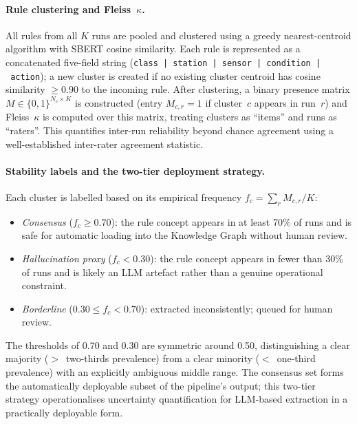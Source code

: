 ﻿\documentclass[11pt]{article}
\begin{document}
\paragraph{Rule clustering and Fleiss~$\kappa$.}
All rules from all $K$ runs are pooled and clustered using a greedy
nearest-centroid algorithm with SBERT cosine similarity.
Each rule is represented as a concatenated five-field string
(\texttt{class~|~station~|~sensor~|~condition~|~action});
a new cluster is created if no existing cluster centroid has cosine
similarity $\geq 0.90$ to the incoming rule.
After clustering, a binary presence matrix
$M \in \{0,1\}^{N_c \times K}$ is constructed (entry $M_{c,r} = 1$ if
cluster~$c$ appears in run~$r$) and Fleiss~$\kappa$ is computed over this
matrix, treating clusters as ``items'' and runs as ``raters''.
This quantifies inter-run reliability beyond chance agreement using a
well-established inter-rater agreement statistic.

\paragraph{Stability labels and the two-tier deployment strategy.}
Each cluster is labelled based on its empirical frequency
$f_c = \sum_r M_{c,r} / K$:
\begin{itemize}
    \item \emph{Consensus} ($f_c \geq 0.70$): the rule concept appears in at
          least 70\% of runs and is safe for automatic loading into the
          Knowledge Graph without human review.
    \item \emph{Hallucination proxy} ($f_c < 0.30$): the rule concept appears
          in fewer than 30\% of runs and is likely an LLM artefact rather than
          a genuine operational constraint.
    \item \emph{Borderline} ($0.30 \leq f_c < 0.70$): extracted inconsistently;
          queued for human review.
\end{itemize}
The thresholds of 0.70 and 0.30 are symmetric around 0.50, distinguishing a
clear majority ($>$~two-thirds prevalence) from a clear minority
($<$~one-third prevalence) with an explicitly ambiguous middle range.
The consensus set forms the automatically deployable subset of the pipeline's
output; this two-tier strategy operationalises uncertainty quantification for
LLM-based extraction in a practically deployable form.

\end{document}
